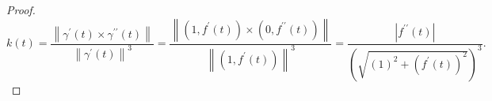 \begin{frame}
    \begin{proof}
        \begin{equation*}
            k\left(t\right)=
            \dfrac{
                \left\|\gamma^{\prime}\left(t\right)\times\gamma^{\prime\prime}\left(t\right)\right\|
            }{
                {\left\|\gamma^{\prime}\left(t\right)\right\|}^{3}
            }=
            \dfrac{
                \left\|
                \left(1,f^{\prime}\left(t\right)\right)\times
                \left(0,f^{\prime\prime}\left(t\right)\right)
                \right\|
            }{
                {\left\|
                        \left(1,f^{\prime}\left(t\right)\right)
                        \right\|}^{3}
            }=
            \dfrac{
            \left|f^{\prime\prime}\left(t\right)\right|
            }{
            {\left(
                    \sqrt{{\left(1\right)}^{2}+{\left(f^{\prime}\left(t\right)\right)}^{2}}
                    \right)}^{3}
            }.
        \end{equation*}
    \end{proof}
\end{frame}